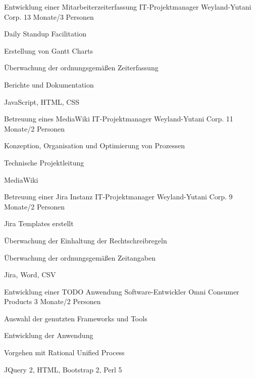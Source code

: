 \documentclass{germanskillsprofile}
\begin{document}
  \begin{spprojects}

    \begin{spproject}
      {Entwicklung einer Mitarbeiterzeiterfassung}
      {}
      {IT-Projektmanager}
      {Weyland-Yutani Corp.}
      {13 Monate/3 Personen}
      {
        \item Daily Standup Facilitation
        \item Erstellung von Gantt Charts
        \item Überwachung der ordnungsgemäßen Zeiterfassung
        \item Berichte und Dokumentation
      }
      {JavaScript, HTML, CSS}
    \end{spproject}

    \begin{spproject}
      {Betreuung eines MediaWiki}
      {}
      {IT-Projektmanager}
      {Weyland-Yutani Corp.}
      {11 Monate/2 Personen}
      {
        \item Konzeption, Organisation und Optimierung von Prozessen
        \item Technische Projektleitung
      }
      {MediaWiki}
    \end{spproject}

    \begin{spproject}
      {Betreuung einer Jira Instanz}
      {}
      {IT-Projektmanager}
      {Weyland-Yutani Corp.}
      {9 Monate/2 Personen}
      {
        \item Jira Templates erstellt
        \item Überwachung der Einhaltung der Rechtschreibregeln
        \item Überwachung der ordnungsgemäßen Zeitangaben
      }
      {Jira, Word, CSV}
    \end{spproject}

    \begin{spproject}
      {Entwicklung einer TODO Anwendung}
      {}
      {Software-Entwickler}
      {Omni Consumer Products}
      {3 Monate/2 Personen}
      {
        \item Auswahl der genutzten Frameworks und Tools
        \item Entwicklung der Anwendung
        \item Vorgehen mit Rational Unified Process
      }
      {JQuery 2, HTML, Bootstrap 2, Perl 5}
    \end{spproject}

  \end{spprojects}
\end{document}
